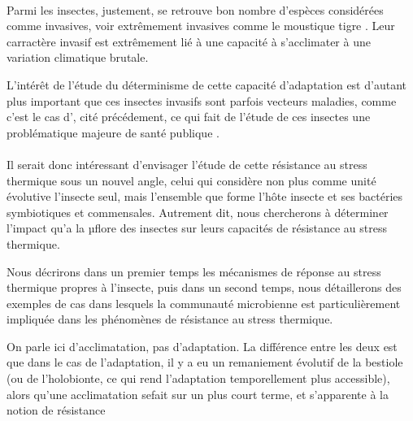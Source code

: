 \paragraph{} %
\label{par:intro2}

Parmi les insectes, justement, se retrouve bon nombre d'espèces considérées
comme invasives, voir extrêmement invasives comme le moustique tigre
. Leur carractère invasif est extrêmement lié à une
capacité à s'acclimater à une variation climatique brutale.


L'intérêt de l'étude du déterminisme de cette capacité d'adaptation est
d'autant plus important que ces insectes invasifs sont parfois vecteurs
maladies, comme c'est le cas d', cité précédement, ce
qui fait de l'étude de ces insectes une problématique majeure de santé
publique \cite{schaffner2013}.



\paragraph{} %
\label{par:intro3}

Il serait donc intéressant d'envisager l'étude de cette résistance au stress
thermique sous un nouvel angle, celui qui considère non plus comme unité
évolutive l'insecte seul, mais l'ensemble que forme l'hôte insecte et ses
bactéries symbiotiques et commensales. Autrement dit, nous chercherons à
déterminer l'impact qu'a la µflore des insectes sur leurs capacités de
résistance au stress thermique.

Nous décrirons dans un premier temps les mécanismes de réponse au stress
thermique propres à l'insecte, puis dans un second temps, nous détaillerons
des exemples de cas dans lesquels la communauté microbienne est
particulièrement impliquée dans les phénomènes de résistance au stress
thermique.

\begin{note}
On parle ici d'acclimatation, pas
d'adaptation. La différence entre les deux est que dans le cas de
l'adaptation, il y a eu un remaniement évolutif de la bestiole (ou de
l'holobionte, ce qui rend l'adaptation temporellement plus accessible), alors
qu'une acclimatation sefait sur un plus court terme, et s'apparente à la
notion de résistance
\end{note}
\lipsum

